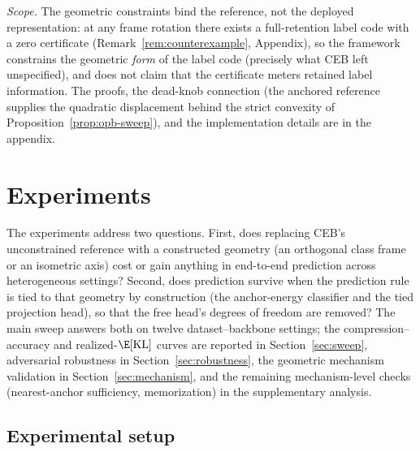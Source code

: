 \documentclass{article} %
\theoremstyle{plain}
\theoremstyle{remark}
\renewcommand{\KL}{\operatorname{KL}}
\begin{document}
\emph{Scope.} The geometric constraints bind the reference, not the deployed
representation: at any frame rotation there exists a full-retention label code with a
zero certificate (Remark~\ref{rem:counterexample}, Appendix), so the framework
constrains the geometric \emph{form} of the label code (precisely what CEB left
unspecified), and does not claim that the certificate meters retained label
information. The proofs, the dead-knob connection (the anchored reference supplies
the quadratic displacement behind the strict convexity of
Proposition~\ref{prop:opb-sweep}), and the implementation details are in the appendix.

\section{Experiments}
\label{sec:experiments}


The experiments address two questions. First, does replacing CEB's unconstrained
reference with a constructed geometry (an orthogonal class frame or an isometric
axis) cost or gain anything in end-to-end prediction across heterogeneous
settings? Second, does prediction survive when the prediction rule is tied to that
geometry by construction (the anchor-energy classifier and the tied projection
head), so that the free head's degrees of freedom are removed? The main sweep
answers both on twelve dataset--backbone settings; the compression--accuracy and
realized-$\E[\KL]$ curves are reported in Section~\ref{sec:sweep},
adversarial robustness in Section~\ref{sec:robustness}, the geometric mechanism
validation in Section~\ref{sec:mechanism}, and the remaining mechanism-level
checks (nearest-anchor sufficiency, memorization) in the supplementary analysis.

\subsection{Experimental setup}
\label{sec:setup}
\end{document}
